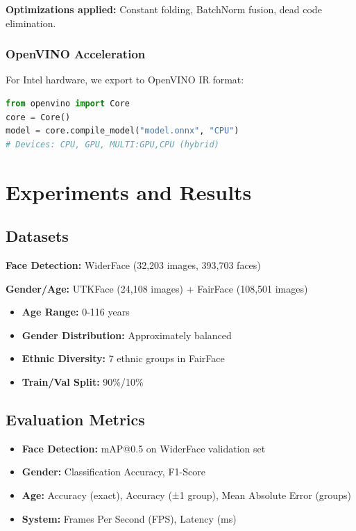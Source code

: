 \documentclass[12pt,a4paper]{article}
\begin{document}
\textbf{Optimizations applied:} Constant folding, BatchNorm fusion, dead code elimination.

\subsubsection{OpenVINO Acceleration}

For Intel hardware, we export to OpenVINO IR format:

\begin{lstlisting}[language=Python, caption=OpenVINO Integration]
from openvino import Core
core = Core()
model = core.compile_model("model.onnx", "CPU")
# Devices: CPU, GPU, MULTI:GPU,CPU (hybrid)
\end{lstlisting}

\section{Experiments and Results}

\subsection{Datasets}

\textbf{Face Detection:} WiderFace (32,203 images, 393,703 faces)

\textbf{Gender/Age:} UTKFace (24,108 images) + FairFace (108,501 images)

\begin{itemize}
    \item \textbf{Age Range:} 0-116 years
    \item \textbf{Gender Distribution:} Approximately balanced
    \item \textbf{Ethnic Diversity:} 7 ethnic groups in FairFace
    \item \textbf{Train/Val Split:} 90\%/10\%
\end{itemize}

\subsection{Evaluation Metrics}

\begin{itemize}
    \item \textbf{Face Detection:} mAP@0.5 on WiderFace validation set
    \item \textbf{Gender:} Classification Accuracy, F1-Score
    \item \textbf{Age:} Accuracy (exact), Accuracy (±1 group), Mean Absolute Error (groups)
    \item \textbf{System:} Frames Per Second (FPS), Latency (ms)
\end{itemize}
\end{document}
